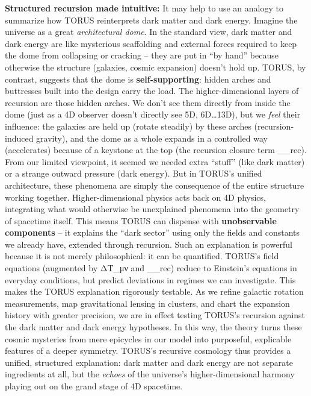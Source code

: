 \documentclass[
]{article}
\begin{document}
{\textbf{Structured recursion made intuitive:} It may help to use an
analogy to summarize how TORUS reinterprets dark matter and dark energy.
Imagine the universe as a great \emph{architectural dome}. In the
standard view, dark matter and dark energy are like mysterious
scaffolding and external forces required to keep the dome from
collapsing or cracking -- they are put in ``by hand'' because otherwise
the structure (galaxies, cosmic expansion) doesn't hold up. TORUS, by
contrast, suggests that the dome is \textbf{self-supporting}: hidden
arches and buttresses built into the design carry the load. The
higher-dimensional layers of recursion are those hidden arches. We don't
see them directly from inside the dome (just as a 4D observer doesn't
directly see 5D, 6D\ldots13D), but we \emph{feel} their influence: the
galaxies are held up (rotate steadily) by these arches
(recursion-induced gravity), and the dome as a whole expands in a
controlled way (accelerates) because of a keystone at the top (the
recursion closure term
\Lambda\__{rec}). From our
limited viewpoint, it seemed we needed extra ``stuff'' (like dark
matter) or a strange outward pressure (dark energy). But in TORUS's
unified architecture, these phenomena are simply the consequence of the
entire structure working together. Higher-dimensional physics acts back
on 4D physics, integrating what would otherwise be unexplained phenomena
into the geometry of spacetime itself\hspace{0pt}. This means TORUS can
dispense with \textbf{unobservable components} -- it explains the ``dark
sector'' using only the fields and constants we already have, extended
through recursion. Such an explanation is powerful because it is not
merely philosophical: it can be quantified. TORUS's field equations
(augmented by ΔT_{μν}{}
and \Lambda\__{rec}) reduce to
Einstein's equations in everyday conditions, but predict deviations in
regimes we can investigate\hspace{0pt}. This makes the TORUS explanation
rigorously testable. As we refine galactic rotation measurements, map
gravitational lensing in clusters, and chart the expansion history with
greater precision, we are in effect testing TORUS's recursion against
the dark matter and dark energy hypotheses. In this way, the theory
turns these cosmic mysteries from mere epicycles in our model into
purposeful, explicable features of a deeper symmetry. TORUS's recursive
cosmology thus provides a unified, structured explanation: dark matter
and dark energy are not separate ingredients at all, but the
\emph{echoes} of the universe's higher-dimensional harmony playing out
on the grand stage of 4D spacetime.

}
\end{document}
